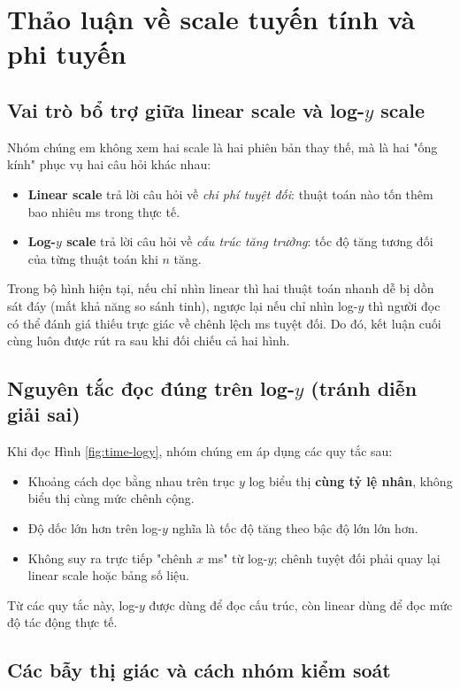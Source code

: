 \section{Thảo luận về scale tuyến tính và phi tuyến}

\subsection{Vai trò bổ trợ giữa linear scale và log-$y$ scale}

Nhóm chúng em không xem hai scale là hai phiên bản thay thế, mà là hai "ống kính" phục vụ hai câu hỏi khác nhau:
\begin{itemize}[leftmargin=1.2cm]
    \item \textbf{Linear scale} trả lời câu hỏi về \textit{chi phí tuyệt đối}: thuật toán nào tốn thêm bao nhiêu ms trong thực tế.
    \item \textbf{Log-$y$ scale} trả lời câu hỏi về \textit{cấu trúc tăng trưởng}: tốc độ tăng tương đối của từng thuật toán khi $n$ tăng.
\end{itemize}

Trong bộ hình hiện tại, nếu chỉ nhìn linear thì hai thuật toán nhanh dễ bị dồn sát đáy (mất khả năng so sánh tinh),
ngược lại nếu chỉ nhìn log-$y$ thì người đọc có thể đánh giá thiếu trực giác về chênh lệch ms tuyệt đối.
Do đó, kết luận cuối cùng luôn được rút ra sau khi đối chiếu cả hai hình.

\subsection{Nguyên tắc đọc đúng trên log-$y$ (tránh diễn giải sai)}

Khi đọc Hình \ref{fig:time-logy}, nhóm chúng em áp dụng các quy tắc sau:
\begin{itemize}[leftmargin=1.2cm]
    \item Khoảng cách dọc bằng nhau trên trục $y$ log biểu thị \textbf{cùng tỷ lệ nhân}, không biểu thị cùng mức chênh cộng.
    \item Độ dốc lớn hơn trên log-$y$ nghĩa là tốc độ tăng theo bậc độ lớn lớn hơn.
    \item Không suy ra trực tiếp "chênh $x$ ms" từ log-$y$; chênh tuyệt đối phải quay lại linear scale hoặc bảng số liệu.
\end{itemize}

Từ các quy tắc này, log-$y$ được dùng để đọc cấu trúc, còn linear dùng để đọc mức độ tác động thực tế.

\subsection{Các bẫy thị giác và cách nhóm kiểm soát}


